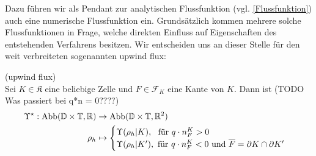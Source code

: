 Dazu führen wir als Pendant zur analytischen Flussfunktion (vgl. \ref{Flussfunktion})
auch eine numerische Flussfunktion ein. Grundsätzlich kommen mehrere solche Flussfunktionen in Frage, welche direkten Einfluss auf Eigenschaften des entstehenden Verfahrens besitzen. Wir entscheiden uns an dieser Stelle für den weit verbreiteten 
sogenannten upwind flux:
\begin{Definition}(upwind flux)\\
	Sei $K \in \mathfrak{K}$ eine beliebige Zelle und $ F \in \mathcal{F}_K$ eine Kante von $K$. Dann ist  (TODO Was passiert bei q*n = 0????)
	\begin{align*}
		\Upsilon^{\star} : \text{Abb}(\mathbb{D}\times\mathbb{T},\mathbb{R}) &\to \text{Abb}(\mathbb{D}\times\mathbb{T},\mathbb{R}^2) \\
		\rho_h &\mapsto 
		\begin{cases}
			\Upsilon(\rho_h|K) , \ \text{ für } q\cdot n_F^K > 0 \\  
			\Upsilon(\rho_h|K') ,\text{ für } q\cdot n_F^K < 0 \text{ und } \overline{F} = \partial K \cap \partial K'
		\end{cases}
	\end{align*}
\end{Definition}
